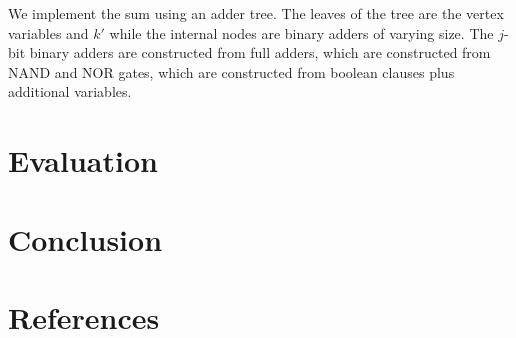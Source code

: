 \documentclass[]{article}
\begin{document}
	We implement the sum using an adder tree. The leaves of the tree are the vertex variables and $k'$ while the internal nodes are binary adders of varying size. The $j$-bit binary adders are constructed from full adders, which are constructed from NAND and NOR gates, which are constructed from boolean clauses plus additional variables.
	\section{Evaluation}
	
	\section{Conclusion}
	
	\section{References}
	
	
	
\end{document}
